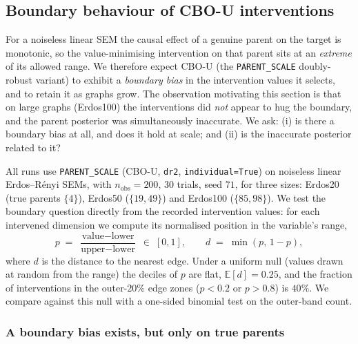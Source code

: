 
\subsection{Boundary behaviour of CBO-U interventions}
\label{sec:boundary-behaviour}

For a noiseless linear SEM the causal effect of a genuine parent on the target is monotonic, so the value-minimising intervention on that parent sits at an \emph{extreme} of its allowed range. We therefore expect CBO-U (the \texttt{PARENT\_SCALE} doubly-robust variant) to exhibit a \emph{boundary bias} in the intervention values it selects, and to retain it as graphs grow. The observation motivating this section is that on large graphs (Erdos100) the interventions did \emph{not} appear to hug the boundary, and the parent posterior was simultaneously inaccurate. We ask: (i) is there a boundary bias at all, and does it hold at scale; and (ii) is the inaccurate posterior related to it?

All runs use \texttt{PARENT\_SCALE} (CBO-U, \texttt{dr2}, \texttt{individual=True}) on noiseless linear Erdos--R\'enyi SEMs, with $n_{\text{obs}}=200$, $30$ trials, seed $71$, for three sizes: Erdos20 (true parents $\{4\}$), Erdos50 ($\{19,49\}$) and Erdos100 ($\{85,98\}$). We test the boundary question directly from the recorded intervention values: for each intervened dimension we compute its normalised position in the variable's range,
%
\begin{equation}
  p \;=\; \frac{\text{value} - \text{lower}}{\text{upper} - \text{lower}} \;\in\; [0,1],
  \qquad d \;=\; \min(p,\,1-p),
\end{equation}
%
where $d$ is the distance to the nearest edge. Under a uniform null (values drawn at random from the range) the deciles of $p$ are flat, $\mathbb{E}[d]=0.25$, and the fraction of interventions in the outer-$20\%$ edge zones ($p<0.2$ or $p>0.8$) is $40\%$. We compare against this null with a one-sided binomial test on the outer-band count.

\subsubsection{A boundary bias exists, but only on true parents}


